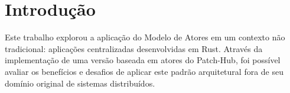 \section{Introdução}

Este trabalho explorou a aplicação do Modelo de Atores em um contexto não tradicional: aplicações centralizadas desenvolvidas em Rust. Através da implementação de uma versão baseada em atores do Patch-Hub, foi possível avaliar os benefícios e desafios de aplicar este padrão arquitetural fora de seu domínio original de sistemas distribuídos.
